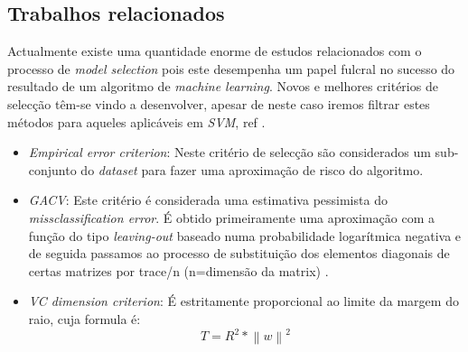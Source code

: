 \subsection{Trabalhos relacionados}
Actualmente existe uma quantidade enorme de estudos relacionados com o processo de \textit{model selection} pois este desempenha um papel fulcral no sucesso do resultado de um algoritmo de \textit{machine learning}. Novos e melhores critérios de selecção têm-se vindo a desenvolver, apesar de neste caso iremos filtrar estes métodos para aqueles aplicáveis em \textit{SVM}, ref \cite{model_selection}.
\begin{itemize}
    \item \textit{Empirical error criterion}: Neste critério de selecção são considerados um sub-conjunto do \textit{dataset} para fazer uma aproximação de risco do algoritmo.
    \item \textit{GACV}: Este critério é considerada uma estimativa pessimista do \textit{missclassification error}.  
    É obtido primeiramente uma aproximação com a função do tipo \textit{leaving-out} baseado numa probabilidade logarítmica negativa e de seguida passamos ao processo de substituição dos elementos diagonais de certas matrizes por trace/n (n=dimensão da matrix) \cite{GCVA}.
    \item  \textit{VC dimension criterion}: É estritamente proporcional ao limite da margem do raio, cuja formula é:
    \begin{equation}
        T = R^{2} * \left \| w \right \|^{2}
    \end{equation}{}
\end{itemize}
